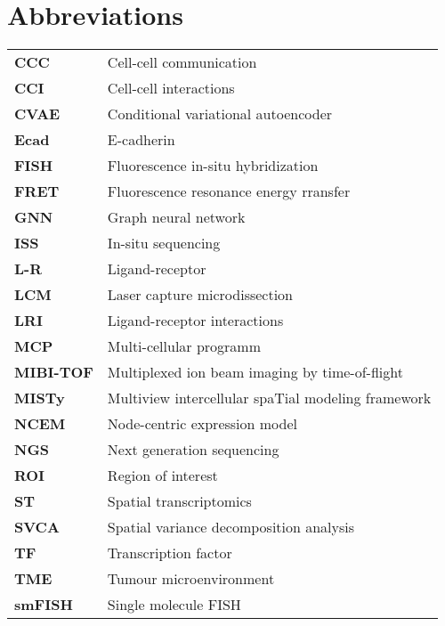 {\setlength{\parskip}{0.2cm}
\chapter*{Abbreviations}
	\begin{acronym}[ABCDEFGHIJK]
		
		
		
	\end{acronym}
}

\begin{table}[!ht]
    \raggedright
    \begin{tabular}{ll}
        \textbf{CCC} & Cell-cell communication \\ 
        \textbf{CCI} & Cell-cell interactions \\ 
        \textbf{CVAE} & Conditional variational autoencoder \\ 
        \textbf{Ecad} & E-cadherin \\ 
        \textbf{FISH} & Fluorescence in-situ hybridization \\ 
        \textbf{FRET} & Fluorescence resonance energy rransfer \\ 
        \textbf{GNN} & Graph neural network \\ 
        \textbf{ISS} & In-situ sequencing \\ 
        \textbf{L-R} & Ligand-receptor \\ 
        \textbf{LCM} & Laser capture microdissection \\ 
        \textbf{LRI} & Ligand-receptor interactions \\ 
        \textbf{MCP} & Multi-cellular programm \\ 
        \textbf{MIBI-TOF} & Multiplexed ion beam imaging by time-of-flight \\ 
        \textbf{MISTy} & Multiview intercellular spaTial modeling framework \\ 
        \textbf{NCEM} & Node-centric expression model \\ 
        \textbf{NGS} & Next generation sequencing \\ 
        \textbf{ROI} & Region of interest \\ 
        \textbf{ST} & Spatial transcriptomics \\ 
        \textbf{SVCA} & Spatial variance decomposition analysis \\ 
        \textbf{TF} & Transcription factor \\ 
        \textbf{TME} & Tumour microenvironment \\ 
        \textbf{smFISH} & Single molecule FISH \\ 
    \end{tabular}
\end{table}